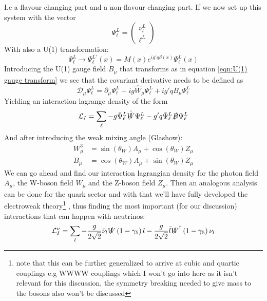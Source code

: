 \documentclass[11pt,a4paper,faculty=we,language=en,doctype=report]{cls/ugent-doc}
\begin{document}
I.e a flavour changing part and a non-flavour changing part. If we now set up this system with the vector
\begin{equation}
	\Psi_\ell^L = \left(\begin{matrix}\nu_l^L\\\ell^L\end{matrix}\right)
\end{equation}
With also a U(1) transformation:
\begin{equation}
	\Psi_\ell^L \rightarrow \Psi_\ell^{L'}(x) = M(x) e^{ig'q\beta(x)}\Psi_\ell^L(x)
\end{equation}
Introducing the U(1) gauge field $B_\mu$ that transforms as in equation \ref{eqn:U(1) gauge transform}
we see that the covariant derivative needs to be defined as 
\begin{equation}
	\mathcal{D}_\mu \Psi_\ell^L = \partial_\mu \Psi_\ell^L + ig\hat{W}_\mu \Psi_\ell^L + ig'qB_\mu\Psi_\ell^L
\end{equation}
Yielding an interaction lagrange density of the form
\begin{equation}
	\mathcal{L}_I = \sum_\ell - g\bar{\Psi}^L_\ell \hat{\slashed{W}}\Psi^L_\ell - g'q\bar{\Psi}_\ell^L\slashed{B}\Psi^L_\ell
\end{equation}
And after introducing the weak mixing angle (Glashow):
\begin{align}
	W_\mu^3 &= \sin(\theta_W)A_\mu + \cos{(\theta_W)}Z_\mu\\
	B_\mu &= \cos{(\theta_W)}A_\mu + \sin{(\theta_W)}Z_\mu
\end{align}
We can go ahead and find our interaction lagrangian density for the
photon field $A_\mu$, the W-boson field $W_\mu$ and the Z-boson field $Z_\mu$.
Then an analogous analysis can be done for the quark sector and with that we'll have fully 
developed the electroweak theory\footnote{note that this can be further generalized to arrive at
cubic and quartic couplings e.g WWWW couplings which I won't go into here as it isn't relevant 
for this discussion, the symmetry breaking needed to give mass to the bosons also won't be 
discussed}
, thus finding the most important (for our discussion) interactions that can happen with neutrinos:
\begin{equation}
	\mathcal{L}_{I}^{\nu} =\sum_l-\frac{g}{2 \sqrt{2}} \bar{\nu}_l \slashed{W}\left(1-\gamma_5\right)l - \frac{g}{2 \sqrt{2}} \bar{l}\slashed{W}^\dagger\left(1-\gamma_5\right) \nu_l
\end{equation}
\end{document}
